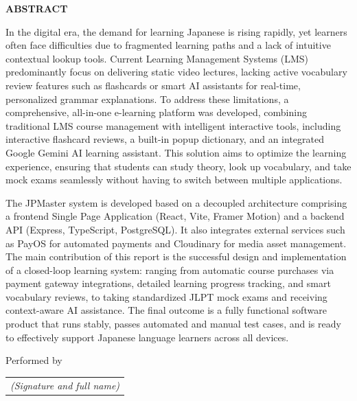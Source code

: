 \documentclass[../DoAn.tex]{subfiles}
\begin{document}
\begin{center}
    \Large{\textbf{ABSTRACT}}\\
\end{center}
\vspace{1cm}
In the digital era, the demand for learning Japanese is rising rapidly, yet learners often face difficulties due to fragmented learning paths and a lack of intuitive contextual lookup tools. Current Learning Management Systems (LMS) predominantly focus on delivering static video lectures, lacking active vocabulary review features such as flashcards or smart AI assistants for real-time, personalized grammar explanations. To address these limitations, a comprehensive, all-in-one e-learning platform was developed, combining traditional LMS course management with intelligent interactive tools, including interactive flashcard reviews, a built-in popup dictionary, and an integrated Google Gemini AI learning assistant. This solution aims to optimize the learning experience, ensuring that students can study theory, look up vocabulary, and take mock exams seamlessly without having to switch between multiple applications.

The JPMaster system is developed based on a decoupled architecture comprising a frontend Single Page Application (React, Vite, Framer Motion) and a backend API (Express, TypeScript, PostgreSQL). It also integrates external services such as PayOS for automated payments and Cloudinary for media asset management. The main contribution of this report is the successful design and implementation of a closed-loop learning system: ranging from automatic course purchases via payment gateway integrations, detailed learning progress tracking, and smart vocabulary reviews, to taking standardized JLPT mock exams and receiving context-aware AI assistance. The final outcome is a fully functional software product that runs stably, passes automated and manual test cases, and is ready to effectively support Japanese language learners across all devices.

\vspace{1cm}
\begin{flushright}
Performed by\\
\begin{tabular}{@{}c@{}}
\textit{(Signature and full name)}
\end{tabular}
\end{flushright}
\end{document}

